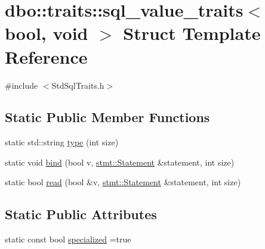 \hypertarget{structdbo_1_1traits_1_1sql__value__traits_3_01bool_00_01void_01_4}{\section{dbo\+:\+:traits\+:\+:sql\+\_\+value\+\_\+traits$<$ bool, void $>$ Struct Template Reference}
\label{structdbo_1_1traits_1_1sql__value__traits_3_01bool_00_01void_01_4}
}


{\ttfamily \#include $<$Std\+Sql\+Traits.\+h$>$}

\subsection*{Static Public Member Functions}
\begin{DoxyCompactItemize}
\item 
static std\+::string \hyperlink{structdbo_1_1traits_1_1sql__value__traits_3_01bool_00_01void_01_4_a369a4f0fa91607e2d27d3cc208bec8b5}{type} (int size)
\item 
static void \hyperlink{structdbo_1_1traits_1_1sql__value__traits_3_01bool_00_01void_01_4_a53a10a7a5033298bb69478205335ba29}{bind} (bool v, \hyperlink{classdbo_1_1stmt_1_1_statement}{stmt\+::\+Statement} \&statement, int size)
\item 
static bool \hyperlink{structdbo_1_1traits_1_1sql__value__traits_3_01bool_00_01void_01_4_a5da071bdd96e4eb6193681a9434885ad}{read} (bool \&v, \hyperlink{classdbo_1_1stmt_1_1_statement}{stmt\+::\+Statement} \&statement, int size)
\end{DoxyCompactItemize}
\subsection*{Static Public Attributes}
\begin{DoxyCompactItemize}
\item 
static const bool \hyperlink{structdbo_1_1traits_1_1sql__value__traits_3_01bool_00_01void_01_4_afb605bed7de8a0b5dc939f9a3fa9e1cc}{specialized} =true
\end{DoxyCompactItemize}


